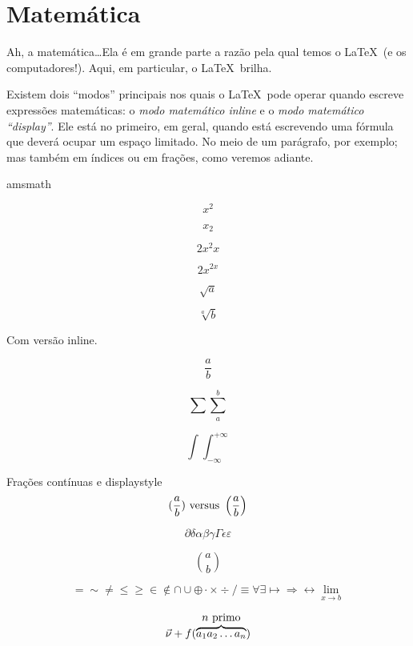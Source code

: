 \section{Matemática}\label{sec:matematica}

Ah, a matemática\ldots Ela é em grande parte a razão pela qual temos o
\LaTeX\ (e os computadores!). Aqui, em particular, o \LaTeX\ brilha.

Existem dois ``modos'' principais nos quais o \LaTeX\ pode operar
quando escreve expressões matemáticas: o \emph{modo matemático inline}
e o \emph{modo matemático ``display''}. Ele está no primeiro, em
geral, quando está escrevendo uma fórmula que deverá ocupar um espaço
limitado. No meio de um parágrafo, por exemplo; mas também em índices
ou em frações, como veremos adiante.


amsmath


$$x^2$$

$$x_2$$

$$2x^2x$$

$$2x^{2x}$$

$$\sqrt{a}$$

$$\sqrt[a]b$$

Com versão inline.

$$\frac ab$$

$$\sum \sum_a^b$$

$$\int\!\!\!\int_{-\infty}^{+\infty}$$

Frações contínuas e displaystyle
$$(\frac ab) \hbox{ versus } \left(\frac ab\right)$$

$$\partial\delta\alpha\beta\gamma\Gamma\epsilon\varepsilon$$

$$a \choose b$$

$$=\sim\neq\leq\geq\in\notin\cap\cup\oplus\cdot\times\div/\equiv\forall\exists\mapsto\Rightarrow\longleftrightarrow
\lim_{x\to b}$$


$$\vec{\nu}+f(\overbrace{a_1a_2\ldots a_n}^{\hbox{$n$ primo}})$$
